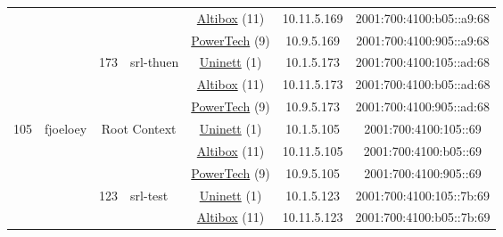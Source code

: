 \begin{small}
\begin{center}
\begin{longtable}{|c|c|c|c|c|c|c|c|}
  &  &  &  & \multicolumn{2}{|c|}{\tiny{\href{https://www.altibox.no}{Altibox} (11)}} & \tiny{10.11.5.169} & \tiny{2001:700:4100:b05::a9:68} \\* \cline{5-5}\cline{6-6}\cline{7-7}\cline{8-8}
  &  &  &  & \multicolumn{2}{|c|}{\tiny{\href{http://www.powertech.no}{PowerTech} (9)}} & \tiny{10.9.5.169} & \tiny{2001:700:4100:905::a9:68} \\* \cline{3-3}\cline{4-4}\cline{5-5}\cline{6-6}\cline{7-7}\cline{8-8}
  &  & \multirow{3}{*}{\tiny{173}} & \multicolumn{1}{|l|}{\multirow{3}{*}{\tiny{srl-thuen}}} & \multicolumn{2}{|c|}{\tiny{\href{https://www.uninett.no}{Uninett} (1)}} & \tiny{10.1.5.173} & \tiny{2001:700:4100:105::ad:68} \\* \cline{5-5}\cline{6-6}\cline{7-7}\cline{8-8}
  &  &  &  & \multicolumn{2}{|c|}{\tiny{\href{https://www.altibox.no}{Altibox} (11)}} & \tiny{10.11.5.173} & \tiny{2001:700:4100:b05::ad:68} \\* \cline{5-5}\cline{6-6}\cline{7-7}\cline{8-8}
  &  &  &  & \multicolumn{2}{|c|}{\tiny{\href{http://www.powertech.no}{PowerTech} (9)}} & \tiny{10.9.5.173} & \tiny{2001:700:4100:905::ad:68} \\ \hline
 \multirow{30}{*}{\tiny{105}} & \multicolumn{1}{|l|}{\multirow{30}{*}{\tiny{fjoeloey}}} & \multicolumn{2}{|c|}{\multirow{3}{*}{\tiny{Root Context}}} & \multicolumn{2}{|c|}{\tiny{\href{https://www.uninett.no}{Uninett} (1)}} & \tiny{10.1.5.105} & \tiny{2001:700:4100:105::69} \\* \cline{5-5}\cline{6-6}\cline{7-7}\cline{8-8}
  &  & \multicolumn{2}{|c|}{} & \multicolumn{2}{|c|}{\tiny{\href{https://www.altibox.no}{Altibox} (11)}} & \tiny{10.11.5.105} & \tiny{2001:700:4100:b05::69} \\* \cline{5-5}\cline{6-6}\cline{7-7}\cline{8-8}
  &  & \multicolumn{2}{|c|}{} & \multicolumn{2}{|c|}{\tiny{\href{http://www.powertech.no}{PowerTech} (9)}} & \tiny{10.9.5.105} & \tiny{2001:700:4100:905::69} \\* \cline{3-3}\cline{4-4}\cline{5-5}\cline{6-6}\cline{7-7}\cline{8-8}
  &  & \multirow{3}{*}{\tiny{123}} & \multicolumn{1}{|l|}{\multirow{3}{*}{\tiny{srl-test}}} & \multicolumn{2}{|c|}{\tiny{\href{https://www.uninett.no}{Uninett} (1)}} & \tiny{10.1.5.123} & \tiny{2001:700:4100:105::7b:69} \\* \cline{5-5}\cline{6-6}\cline{7-7}\cline{8-8}
  &  &  &  & \multicolumn{2}{|c|}{\tiny{\href{https://www.altibox.no}{Altibox} (11)}} & \tiny{10.11.5.123} & \tiny{2001:700:4100:b05::7b:69} \\* \cline{5-5}\cline{6-6}\cline{7-7}\cline{8-8}

\end{longtable}
\end{center}
\end{small}
